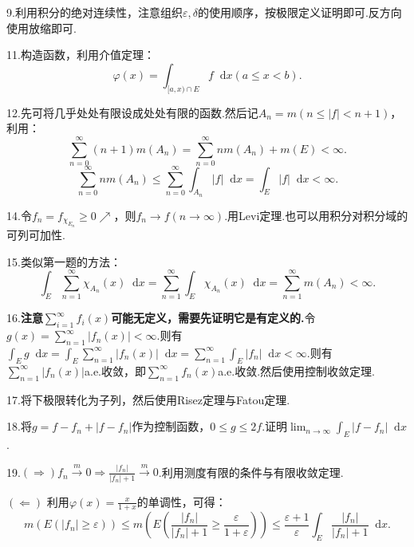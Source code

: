 \documentclass[bwprint, withoutpreface]{cumcmthesis}
\newcommand*{\dif}{\mathop{}\!\mathrm{d}}
\begin{document}
9.利用积分的绝对连续性，注意组织$\varepsilon,\delta$的使用顺序，按极限定义证明即可.反方向使用放缩即可.

11.构造函数，利用介值定理：
\begin{equation*}
	\varphi(x) = \int_{[a, x) \cap E} f \dif x (a \leqslant x < b).
\end{equation*}

12.先可将几乎处处有限设成处处有限的函数.然后记$A_n = m(n \leqslant |f| < n + 1)$，利用：
\begin{equation*}
	\sum_{n = 0}^{\infty}{(n + 1) m(A_n)} = \sum_{n = 0}^{\infty}{n m(A_n)} + m(E) < \infty.
\end{equation*}
\begin{equation*}
	\sum_{n = 0}^{\infty}n m(A_n) \leqslant \sum_{n = 0}^{\infty}{\int_{A_n} |f| \dif x} = \int_E |f| \dif x < \infty.
\end{equation*}

14.令$f_n = f_{\chi_{E_n}} \geqslant 0 \nearrow$，则$f_n \to f (n \to \infty)$.用Levi定理.也可以用积分对积分域的可列可加性.

15.类似第一题的方法：
\begin{equation*}
	\int_E \sum_{n = 1}^{\infty}{\chi_{A_n}(x)} \dif x = \sum_{n = 1}^{\infty}{\int_E \chi_{A_n}(x) \dif x} = \sum_{n = 1}^{\infty}{m(A_n)} < \infty.
\end{equation*}

16.\textbf{注意$\sum_{i = 1}^{\infty}{f_i(x)}$可能无定义，需要先证明它是有定义的.}令$g(x) = \sum_{n = 1}^{\infty}{|f_n(x)|} < \infty$.则有$\int_E g \dif x = \int_E \sum_{n = 1}^{\infty}{|f_n(x)|} \dif x = \sum_{n = 1}^{\infty}{\int_E |f_n| \dif x} < \infty$.则有$\sum_{n = 1}^{\infty}{|f_n(x)|}$a.e.收敛，即$\sum_{n = 1}^{\infty}{f_n(x)}$a.e.收敛.然后使用控制收敛定理.

17.将下极限转化为子列，然后使用Risez定理与Fatou定理.

18.将$g = f - f_n + |f - f_n|$作为控制函数，$0 \leqslant g \leqslant 2f$.证明$\lim_{n \to \infty}{\int_E |f - f_n| \dif x}$.

19.$(\Rightarrow) f_n\stackrel{m}{\longrightarrow} 0 \Rightarrow \frac{|f_n|}{|f_n| + 1} \stackrel{m}{\longrightarrow} 0$.利用测度有限的条件与有限收敛定理.

$(\Leftarrow)$ 利用$\varphi(x) = \frac{x}{1 + x}$的单调性，可得：
\begin{equation*}
	m(E(|f_n| \geqslant \varepsilon)) \leqslant m(E(\frac{|f_n|}{|f_n| + 1} \geqslant \frac{\varepsilon}{1 + \varepsilon})) \leqslant \frac{\varepsilon + 1}{\varepsilon} \int_E \frac{|f_n|}{|f_n| + 1} \dif x.
\end{equation*}
\end{document}
